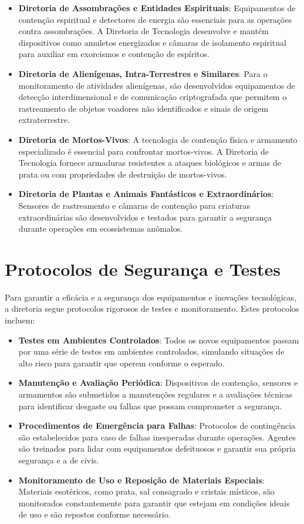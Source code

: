 \begin{itemize}
    \item \textbf{Diretoria de Assombrações e Entidades Espirituais}: Equipamentos de contenção espiritual e detectores de energia são essenciais para as operações contra assombrações. A Diretoria de Tecnologia desenvolve e mantém dispositivos como amuletos energizados e câmaras de isolamento espiritual para auxiliar em exorcismos e contenção de espíritos.
    \item \textbf{Diretoria de Alienígenas, Intra-Terrestres e Similares}: Para o monitoramento de atividades alienígenas, são desenvolvidos equipamentos de detecção interdimensional e de comunicação criptografada que permitem o rastreamento de objetos voadores não identificados e sinais de origem extraterrestre.
    \item \textbf{Diretoria de Mortos-Vivos}: A tecnologia de contenção física e armamento especializado é essencial para confrontar mortos-vivos. A Diretoria de Tecnologia fornece armaduras resistentes a ataques biológicos e armas de prata ou com propriedades de destruição de mortos-vivos.
    \item \textbf{Diretoria de Plantas e Animais Fantásticos e Extraordinários}: Sensores de rastreamento e câmaras de contenção para criaturas extraordinárias são desenvolvidos e testados para garantir a segurança durante operações em ecossistemas anômalos.
\end{itemize}

\section{Protocolos de Segurança e Testes}
Para garantir a eficácia e a segurança dos equipamentos e inovações tecnológicas, a diretoria segue protocolos rigorosos de testes e monitoramento. Estes protocolos incluem:

\begin{itemize}
    \item \textbf{Testes em Ambientes Controlados}: Todos os novos equipamentos passam por uma série de testes em ambientes controlados, simulando situações de alto risco para garantir que operem conforme o esperado.
    \item \textbf{Manutenção e Avaliação Periódica}: Dispositivos de contenção, sensores e armamentos são submetidos a manutenções regulares e a avaliações técnicas para identificar desgaste ou falhas que possam comprometer a segurança.
    \item \textbf{Procedimentos de Emergência para Falhas}: Protocolos de contingência são estabelecidos para caso de falhas inesperadas durante operações. Agentes são treinados para lidar com equipamentos defeituosos e garantir sua própria segurança e a de civis.
    \item \textbf{Monitoramento de Uso e Reposição de Materiais Especiais}: Materiais esotéricos, como prata, sal consagrado e cristais místicos, são monitorados constantemente para garantir que estejam em condições ideais de uso e são repostos conforme necessário.
\end{itemize}

